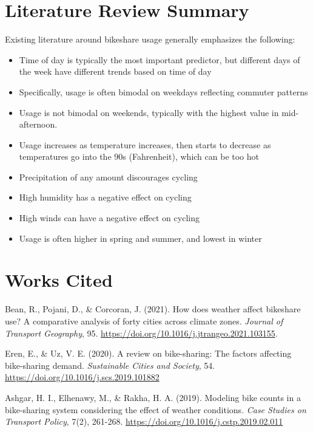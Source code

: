 \documentclass[
  11pt,
]{article}
\providecommand{\tightlist}{%
  \setlength{\itemsep}{0pt}\setlength{\parskip}{0pt}}
\begin{document}
\hypertarget{literature-review-summary}{%
\section{Literature Review Summary}\label{literature-review-summary}}

Existing literature around bikeshare usage generally emphasizes the
following:

\begin{itemize}
\tightlist
\item
  Time of day is typically the most important predictor, but different
  days of the week have different trends based on time of day
\item
  Specifically, usage is often bimodal on weekdays reflecting commuter
  patterns
\item
  Usage is not bimodal on weekends, typically with the highest value in
  mid-afternoon.
\item
  Usage increases as temperature increases, then starts to decrease as
  temperatures go into the 90s (Fahrenheit), which can be too hot
\item
  Precipitation of any amount discourages cycling
\item
  High humidity has a negative effect on cycling
\item
  High winds can have a negative effect on cycling
\item
  Usage is often higher in spring and summer, and lowest in winter
\end{itemize}

\hypertarget{works-cited}{%
\section{Works Cited}\label{works-cited}}

Bean, R., Pojani, D., \& Corcoran, J. (2021). How does weather affect
bikeshare use? A comparative analysis of forty cities across climate
zones. \emph{Journal of Transport Geography}, 95.
\url{https://doi.org/10.1016/j.jtrangeo.2021.103155}.

Eren, E., \& Uz, V. E. (2020). A review on bike-sharing: The factors
affecting bike-sharing demand. \emph{Sustainable Cities and Society},
54. \url{https://doi.org/10.1016/j.scs.2019.101882}

Ashgar, H. I., Elhenawy, M., \& Rakha, H. A. (2019). Modeling bike
counts in a bike-sharing system considering the effect of weather
conditions. \emph{Case Studies on Transport Policy}, 7(2), 261-268.
\url{https://doi.org/10.1016/j.cstp.2019.02.011}
\end{document}
